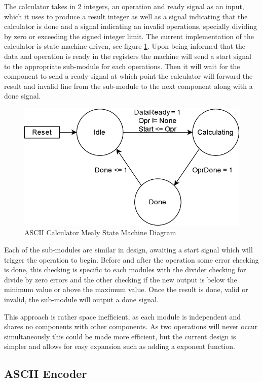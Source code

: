 \documentclass[11pt]{article}
\begin{document}
The calculator takes in 2 integers, an operation and ready signal as an input, which it uses to produce a result integer as well as a signal indicating that the calculator is done and a signal indicating an invalid operations, specially dividing by zero or exceeding the signed integer limit.
The current implementation of the calculator is state machine driven, see figure \ref{fig:calcsm}. 
Upon being informed that the data and operation is ready in the registers the machine will send a start signal to the appropriate sub-module for each operations.
Then it will wait for the component to send a ready signal at which point the calculator will forward the result and invalid line from the sub-module to the next component along with a done signal.

\begin{figure}[H]        
    \centering
    \includegraphics[width=.66\textwidth]{CalculatorSM.drawio.png}
    \caption{ASCII Calculator Mealy State Machine Diagram}
    \label{fig:calcsm}
\end{figure} 

Each of the sub-modules are similar in design, awaiting a start signal which will trigger the operation to begin.
Before and after the operation some error checking is done,
this checking is specific to each modules with the divider checking for divide by zero errors and the other checking if the new output is below the minimum value or above the maximum value.
Once the result is done, valid or invalid, the sub-module will output a done signal.

This approach is rather space inefficient, as each module is independent and shares no components with other components.
As two operations will never occur simultaneously this could be made more efficient,
but the current design is simpler and allows for easy expansion such as adding a exponent function.

\subsection{ASCII Encoder}
\end{document}
